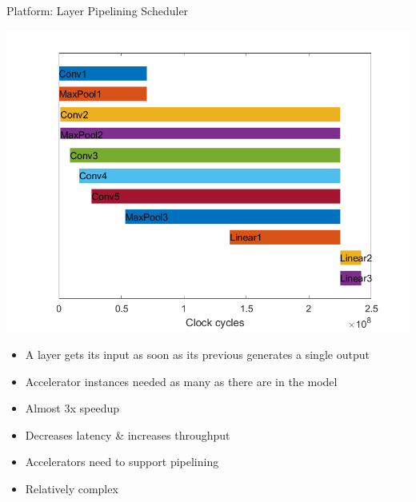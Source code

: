 \begin{frame}{Platform: Layer Pipelining Scheduler}
	\begin{minipage}{0.6\textwidth}
		\centering
		\includegraphics[width=\textwidth]{../Images/Scheduling/Pipelined-1x.png}\\
	\end{minipage}%
	\begin{minipage}{0.4\textwidth}
		\begin{itemize}
			\item A layer gets its input as soon as its previous generates a single output
			\item Accelerator instances needed as many as there are in the model
			\item Almost 3x speedup
			\item Decreases latency \& increases throughput
			\item Accelerators need to support pipelining
			\item Relatively complex
		\end{itemize}
	\end{minipage}
\end{frame}

